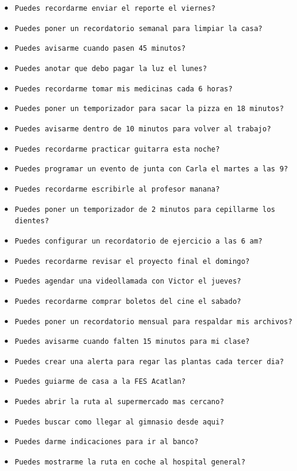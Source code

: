 \documentclass[a4paper,12pt]{article}
\begin{document}
\begin{itemize}
    \item \texttt{Puedes recordarme enviar el reporte el viernes?}
    \item \texttt{Puedes poner un recordatorio semanal para limpiar la casa?}
    \item \texttt{Puedes avisarme cuando pasen 45 minutos?}
    \item \texttt{Puedes anotar que debo pagar la luz el lunes?}
    \item \texttt{Puedes recordarme tomar mis medicinas cada 6 horas?}
    \item \texttt{Puedes poner un temporizador para sacar la pizza en 18 minutos?}
    \item \texttt{Puedes avisarme dentro de 10 minutos para volver al trabajo?}
    \item \texttt{Puedes recordarme practicar guitarra esta noche?}
    \item \texttt{Puedes programar un evento de junta con Carla el martes a las 9?}
    \item \texttt{Puedes recordarme escribirle al profesor manana?}
    \item \texttt{Puedes poner un temporizador de 2 minutos para cepillarme los dientes?}
    \item \texttt{Puedes configurar un recordatorio de ejercicio a las 6 am?}
    \item \texttt{Puedes recordarme revisar el proyecto final el domingo?}
    \item \texttt{Puedes agendar una videollamada con Victor el jueves?}
    \item \texttt{Puedes recordarme comprar boletos del cine el sabado?}
    \item \texttt{Puedes poner un recordatorio mensual para respaldar mis archivos?}
    \item \texttt{Puedes avisarme cuando falten 15 minutos para mi clase?}
    \item \texttt{Puedes crear una alerta para regar las plantas cada tercer dia?}
    \item \texttt{Puedes guiarme de casa a la FES Acatlan?}
    \item \texttt{Puedes abrir la ruta al supermercado mas cercano?}
    \item \texttt{Puedes buscar como llegar al gimnasio desde aqui?}
    \item \texttt{Puedes darme indicaciones para ir al banco?}
    \item \texttt{Puedes mostrarme la ruta en coche al hospital general?}

\end{itemize}
\end{document}
